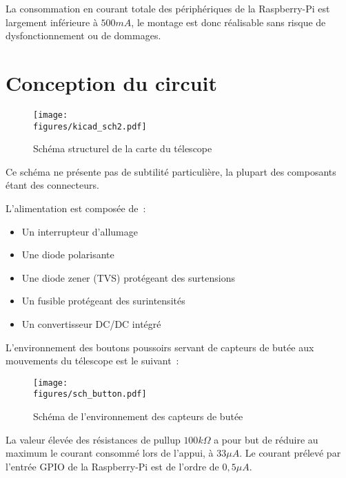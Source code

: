 La consommation en courant totale des périphériques de la Raspberry-Pi est largement inférieure à $500mA$, le montage est donc réalisable sans risque de dysfonctionnement ou de dommages.

\section{Conception du circuit}

\begin{figure}[H]
    \centering
    \texttt{[image: \\figures/kicad\_sch2.pdf]}
    \decoRule
    \caption[
    Schéma structurel de la carte du télescope]{
    Schéma structurel de la carte du télescope}
    \label{fig:Schéma structurel de la carte du télescope}
    \end{figure}

\vspace{1cm}

Ce schéma ne présente pas de subtilité particulière, la plupart des composants étant des connecteurs.

\vspace{1cm}

L'alimentation est composée de~:
\begin{itemize}[label=$\bullet$]
	\item Un interrupteur d'allumage
	\item Une diode polarisante
	\item Une diode zener (TVS) protégeant des surtensions
	\item Un fusible protégeant des surintensités
	\item Un convertisseur DC/DC intégré
	\end{itemize}

\vspace{1cm}

L'environnement des boutons poussoirs servant de capteurs de butée aux mouvements du télescope est le suivant~:

\begin{figure}[H]
    \centering
    \texttt{[image: \\figures/sch\_button.pdf]}
    \decoRule
    \caption[
    Schéma de l'environnement des capteurs de butée]{
    Schéma de l'environnement des capteurs de butée}
    \label{fig:Schéma de l'environnement des capteurs de butée}
    \end{figure}

\vspace{1cm}

La valeur élevée des résistances de pullup $100k\Omega$ a pour but de réduire au maximum le courant consommé lors de l'appui, à $33\mu A$. Le courant prélevé par l'entrée GPIO de la Raspberry-Pi est de l'ordre de $0,5\mu A$.

